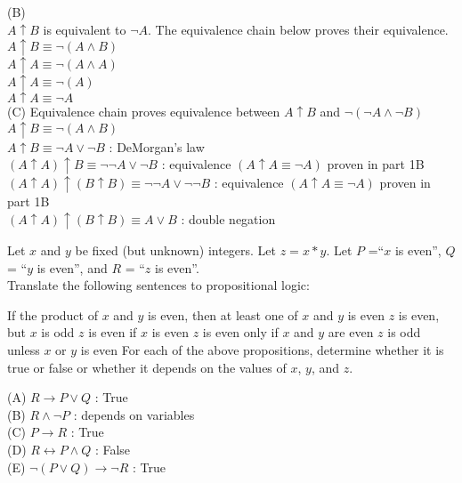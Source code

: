 \documentclass[solution,letterpaper]{cs20}
\begin{document}
\begin{problem}
\begin{solution}
    (B) \\ 
    $A \uparrow B$ is equivalent to $\neg A$. The equivalence chain below proves their equivalence. \\ 
    $A \uparrow B \equiv \neg(A \land B)$  \\
    $A \uparrow A \equiv \neg(A \land A)$ \\
    $A \uparrow A \equiv \neg(A)$ \\
    $A \uparrow A \equiv \neg A$ \\
    
    (C) Equivalence chain proves equivalence between $A \uparrow B$ and $\neg (\neg A \land \neg B)$\\
    $A \uparrow B \equiv \neg(A \land B)$ \\
    $A \uparrow B \equiv \neg A \lor \neg B$ :                                      DeMorgan's law \\
    $(A \uparrow A) \uparrow B \equiv \neg \neg A \lor \neg B$ :                    equivalence $(A \uparrow A \equiv \neg A)$ proven in part 1B \\
    $(A \uparrow A) \uparrow (B \uparrow B) \equiv \neg \neg A \lor \neg \neg B$ :  equivalence $(A \uparrow A \equiv \neg A)$ proven in part 1B \\
    $(A \uparrow A) \uparrow (B \uparrow B) \equiv A \lor B$ :                      double negation \\
\end{solution}
\end{problem}

\begin{problem}
Let $x$ and $y$ be fixed (but unknown) integers. Let $z = x * y$. Let $P$ =``$x$ is even'', $Q$ = ``$y$ is even'', and $R$ = ``$z$ is even''. \\

\noindent Translate the following sentences to propositional logic: 

\subproblem If the product of $x$ and $y$ is even, then at least one of $x$ and $y$ is even
\subproblem $z$ is even, but $x$ is odd
\subproblem $z$ is even if $x$ is even
\subproblem $z$ is even only if $x$ and $y$ are even
\subproblem $z$ is odd unless $x$ or $y$ is even
\subproblem For each of the above propositions, determine whether it is true or false or whether it depends on the values of $x$, $y$, and $z$.

\begin{solution}
(A) $R \to P \lor Q$ : True\\
(B) $R \land \neg P$ : depends on variables\\
(C) $P \to R$ : True \\
(D) $R \leftrightarrow P \land Q$ : False\\
(E) $\neg (P \lor Q) \to \neg R$ : True\\
\end{solution}
\end{problem}
\pagebreak
\end{document}
